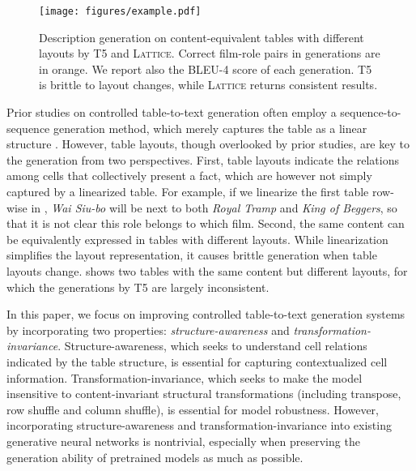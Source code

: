 \documentclass[11pt]{article}
\newcommand{\model}{\mbox{\textsc{Lattice}}\xspace}
\begin{document}
\begin{figure}[t]
  \begin{center}
    \texttt{[image: figures/example.pdf]} \end{center}
  \caption{Description generation on content-equivalent tables with different layouts by T5 and \model\footnotemark. Correct film-role pairs in generations are in orange. We report also the BLEU-4 score of each generation. T5 is brittle to layout changes, while \model returns consistent results. 
  }
  \label{fig/example}
\end{figure}

Prior studies on controlled table-to-text generation often employ a sequence-to-sequence generation method, which merely captures the table as a linear structure \citep{parikh2020totto, kale2020text, su2021plan}.
However, table layouts, though overlooked by prior studies,  are key to the generation from two perspectives. First, table layouts indicate the relations among cells that collectively present a fact, which are however not simply captured by a linearized table. For example, if we linearize the first table row-wise in , \textit{Wai Siu-bo} will be next to both \textit{Royal Tramp} and \textit{King of Beggers}, so that it is not clear this role belongs to which film.
Second, the same content can be equivalently expressed in tables with different layouts. While linearization simplifies the layout representation, it causes brittle generation when table layouts change. 
 shows two tables with the same content but different layouts, for which the generations by T5 are largely inconsistent.


In this paper, we focus on improving controlled table-to-text generation systems by incorporating two properties: \emph{structure-awareness} and \emph{transformation-invariance}.
Structure-awareness, which seeks to understand cell relations indicated by the table structure, is essential for capturing contextualized cell information. 
Transformation-invariance, which seeks to make the model insensitive to content-invariant structural transformations (including transpose, row shuffle and column shuffle), is essential for model robustness.
However, incorporating structure-awareness and transformation-invariance into existing generative neural networks is nontrivial, especially when preserving the generation ability of pretrained models as much as possible.
\end{document}
